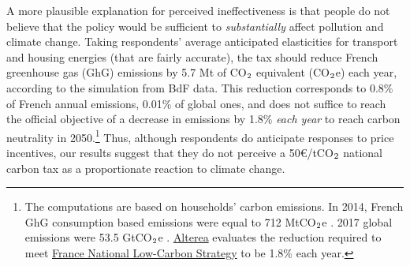 \documentclass[11pt]{article}
\begin{document}

A more plausible explanation for perceived ineffectiveness is that people do not believe that the policy would be sufficient to \textit{substantially} affect pollution and climate change. Taking respondents' average anticipated elasticities for transport and housing energies (that are fairly accurate), the tax should reduce French greenhouse gas (GhG) emissions by 5.7 Mt of CO$_\textnormal{2}$ equivalent (CO$_\textnormal{2}$e) each year, according to the simulation from BdF data. This reduction corresponds to 0.8\% of French annual emissions, 0.01\% of global ones, and does not suffice to reach the official objective of a decrease in emissions by 1.8\% \textit{each year} to reach carbon neutrality in 2050.\footnote{The computations are based on households' carbon emissions. In 2014, French GhG consumption based emissions were equal to 712 MtCO$_\textnormal{2}$e \citep{cgdd_chiffres_2019}. 2017 global emissions were 53.5 GtCO$_\textnormal{2}$e \citep{unep_emissions_2018}. \href{https://www.alterea.fr/strategie-nationale-bas-carbone-de-la-france-en-consultation/}{Alterea} evaluates the reduction required to meet \href{https://www.ecologique-solidaire.gouv.fr/strategie-nationale-bas-carbone-snbc}{France National Low-Carbon Strategy} \citep{ministry_of_ecology_france_2015} to be 1.8\% each year.} Thus, although respondents do anticipate responses to price incentives, our results suggest that they do not perceive a 50\euro/tCO$_\textnormal{2}$ national carbon tax as a proportionate reaction to climate change.

\end{document}

